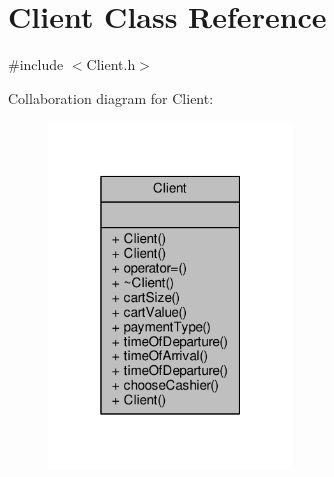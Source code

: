 \hypertarget{classClient}{\section{Client Class Reference}
\label{classClient}
}


{\ttfamily \#include $<$Client.\-h$>$}



Collaboration diagram for Client\-:\nopagebreak
\begin{figure}[H]
\begin{center}
\leavevmode
\includegraphics[width=184pt]{classClient__coll__graph}
\end{center}
\end{figure}
